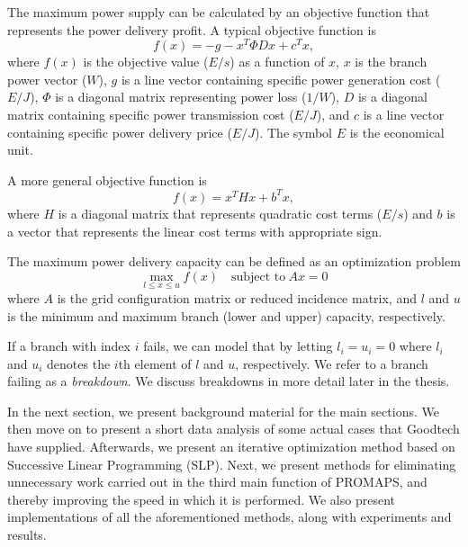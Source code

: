 \documentclass[a4paper,12pt]{report}
\begin{document}
The maximum power
supply can be calculated by an objective function that represents the power
delivery profit. A typical objective function is
\[
f(x) = -g - x^T \Phi D x + c^T x,
\]
where $f(x)$ is the objective value ($E/s$) as a function of $x$, $x$ is the
branch power vector ($W$), $g$ is a line vector containing specific power
generation cost ($E/J$), $\Phi$ is a diagonal matrix representing power loss
($1/W$), $D$ is a diagonal matrix containing specific power transmission cost
($E/J$), and $c$ is a line vector containing specific power delivery price
($E/J$).
The symbol $E$ is the economical unit\cite{digernes}.

A more general objective function is
\begin{equation}
    f(x) = x^T H x + b^T x, \label{eq:obj}
\end{equation}
where $H$ is a diagonal matrix that represents quadratic cost terms ($E/s$) and
$b$ is a vector that represents the linear cost terms with appropriate
sign\cite{digernes}.

The maximum power delivery capacity can be defined as an optimization problem
\begin{equation}
   \max_{l \le x \le u} f(x)\quad\textrm{subject to}~Ax = 0 \label{eq:thesisqp}
\end{equation}
where $A$ is the grid configuration matrix or reduced incidence matrix, and
$l$ and $u$ is the minimum and maximum branch (lower and upper) capacity,
respectively\cite{digernes}.

If a branch with index $i$ fails, we can model that by letting
$l_i = u_i = 0$ where $l_i$ and $u_i$ denotes the $i$th element of $l$ and
$u$, respectively. We refer to a branch failing as a \textit{breakdown}.
We discuss breakdowns in more detail later in the thesis.

In the next section, we present background material for the
main sections. We then move on to present a short data analysis of
some actual cases that Goodtech have supplied. Afterwards, we present
an iterative optimization method based on Successive Linear Programming (SLP).
Next, we present methods for eliminating unnecessary work carried out in the
third main function of PROMAPS, and thereby improving the speed in which it is
performed.
We also present implementations of all the aforementioned methods, along with
experiments and results.






\end{document}
